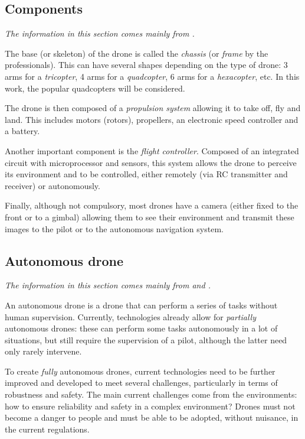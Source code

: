 \subsection{Components}

\emph{The information in this section comes mainly from \cite{studiosport2021composantsdrone}.}

The base (or skeleton) of the drone is called the \emph{chassis} (or \emph{frame} by the professionals). This can have several shapes depending on the type of drone: 3 arms for a \emph{tricopter}, 4 arms for a \emph{quadcopter}, 6 arms for a \emph{hexacopter}, etc. In this work, the popular quadcopters will be considered.

The drone is then composed of a \emph{propulsion system} allowing it to take off, fly and land. This includes motors (rotors), propellers, an electronic speed controller and a battery.

Another important component is the \emph{flight controller}. Composed of an integrated circuit with microprocessor and sensors, this system allows the drone to perceive its environment and to be controlled, either remotely (via RC transmitter and receiver) or autonomously.

Finally, although not compulsory, most drones have a camera (either fixed to the front or to a gimbal) allowing them to see their environment and transmit these images to the pilot or to the autonomous navigation system.

\subsection{Autonomous drone}

\emph{The information in this section comes mainly from \cite{ansys2019autonomousuav} and \cite{skyhopper2021autonomousuav}.}

An autonomous drone is a drone that can perform a series of tasks without human supervision. Currently, technologies already allow for \emph{partially} autonomous drones: these can perform some tasks autonomously in a lot of situations, but still require the supervision of a pilot, although the latter need only rarely intervene.

To create \emph{fully} autonomous drones, current technologies need to be further improved and developed to meet several challenges, particularly in terms of robustness and safety. The main current challenges come from the environments: how to ensure reliability and safety in a complex environment? Drones must not become a danger to people and must be able to be adopted, without nuisance, in the current regulations.


